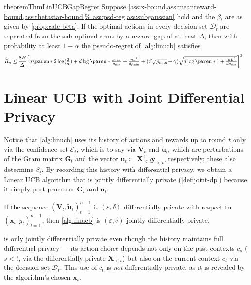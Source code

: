 \documentclass{article}
\renewcommand{\vec}[1]{\bm{#1}}
\newcommand{\defeq}{\coloneq}
\DeclarePairedDelimiter{\paren}()
\DeclarePairedDelimiter{\brck}{[}{]}
\newcommand{\D}{\mathcal{D}}
\newcommand{\E}{\mathcal{E}}
\providecommand\transp{\top}
\let\transpsymbol\transp
\renewcommand{\transp}[1]{#1^\transpsymbol}
\begin{document}
\begin{restatable}{theorem}{ThmLinUCBGapRegret}%
  \label{thm:linucb-gap-regret}
  Suppose \cref{ass:x-bound,ass:meanreward-bound,ass:thetastar-bound,%
    ass:psd-reg,ass:subgaussian} hold and the
  $\beta_t$ are as given by \cref{prop:calc-beta}.  If the optimal
  actions in every decision set $\D_t$ are separated from the
  sub-optimal arms by a reward gap of at least $\Delta$, then with
  probability at least $1-\alpha$ the pseudo-regret of
  \cref{alg:linucb} satisfies
  \begin{align}
  \label{eq:regret_gap_general_formula}
    \widehat R_n
    &\le \frac{8B}{\Delta} \brck[\bigg]{\sigma\paren*{2\log(\tfrac{2}{\alpha})
      + d\log\paren*{\tfrac{\rho_{\max}}{\rho_{\min}} + \tfrac{nL^2}{d\rho_{\min}}}}
      + (S\sqrt{\rho_{\max}}+\gamma)\sqrt{d\log\paren*{1+\tfrac{nL^2}{d\rho_{\min}}}}}^2
  \end{align}
\end{restatable}

\section{Linear UCB with Joint Differential Privacy}
\label{sec:alg-dp}

Notice that \cref{alg:linucb} uses its history of actions and rewards
up to round $t$ only via the confidence set $\E_t$, which is to say
via $\vec V_t$ and $\tilde{\vec u}_t$, which are perturbations of the Gram
matrix $\vec G_t$ and the vector
$\vec u_t \defeq \transp{\vec X_{<t}} \vec y_{<t}$, respectively;
these also determine $\beta_t$.  By recording this history with
differential privacy, we obtain a Linear UCB algorithm that is jointly
differentially private (\cref{def:joint-dp}) because it simply
post-processes $\vec G_t$ and $\vec u_t$.

\begin{claim}
  If the sequence $(\vec V_t,\tilde{\vec u}_t)_{t=1}^{n-1}$ is
  $(\varepsilon,\delta)$-differentially private with respect to
  $(\vec x_t, y_t)_{t=1}^{n-1}$, then \cref{alg:linucb} is
  $(\varepsilon,\delta)$-jointly differentially private.
\end{claim}

\begin{remark}
   is only jointly differentially private even though
  the history maintains full differential privacy --- its action
  choice depends not only on the past contexts $c_s$ ($s < t$, via the
  differentially private $\vec X_{<t}$) but also on the current
  context $c_t$ via the decision set $\D_t$.  This use of $c_t$
  is \emph{not} differentially private, as it is revealed by the algorithm's
  chosen $\vec x_t$.
\end{remark}
\end{document}
